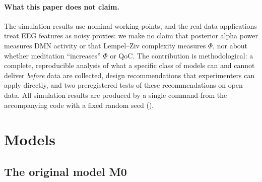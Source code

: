 \documentclass[12pt,a4paper]{article}
\theoremstyle{plain}
\theoremstyle{definition}
\theoremstyle{remark}
\begin{document}
\paragraph{What this paper does not claim.} The simulation results use nominal working points, and the real-data applications treat EEG features as noisy proxies: we make no claim that posterior alpha power measures DMN activity or that Lempel--Ziv complexity measures $\Phi$, nor about whether meditation ``increases'' $\Phi$ or QoC. The contribution is methodological: a complete, reproducible analysis of what a specific class of models can and cannot deliver \emph{before} data are collected, design recommendations that experimenters can apply directly, and two preregistered tests of these recommendations on open data. All simulation results are produced by a single command from the accompanying code with a fixed random seed ().

\section{Models}
\label{sec:model}

\subsection{The original model M0}
\label{sec:m0}
\end{document}
